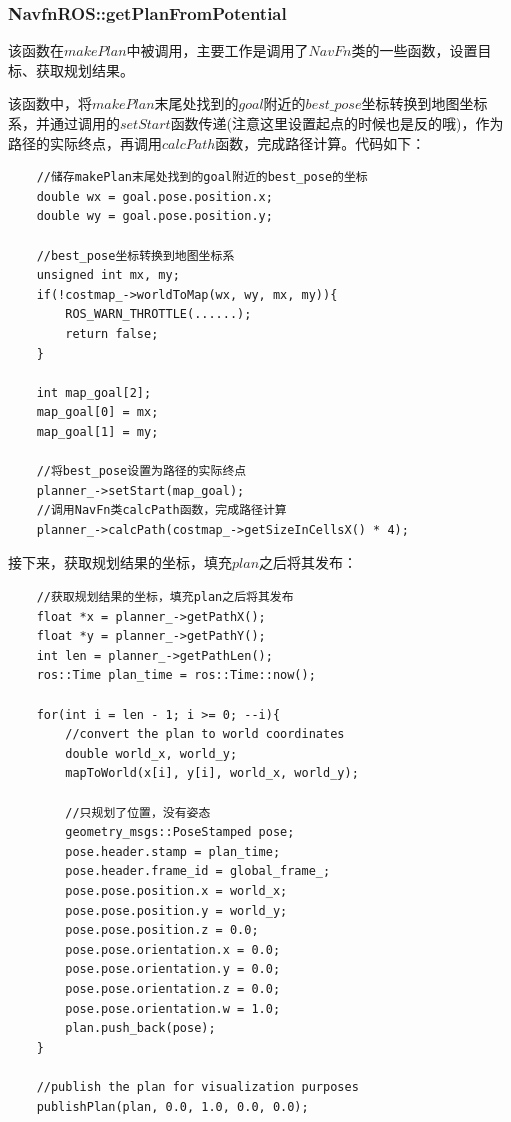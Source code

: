 \documentclass[9pt, oneside]{book}
\begin{document}
\subsubsection{NavfnROS::getPlanFromPotential}

该函数在$makePlan$中被调用，主要工作是调用了$NavFn$类的一些函数，设置目标、获取规划结果。

该函数中，将$makePlan$末尾处找到的$goal$附近的$best\_pose$坐标转换到地图坐标系，并通过调用的$setStart$函数传递(注意这里设置起点的时候也是反的哦)，作为路径的实际终点，再调用$calcPath$函数，完成路径计算。代码如下：

\begin{verbatim}
    //储存makePlan末尾处找到的goal附近的best_pose的坐标
    double wx = goal.pose.position.x;
    double wy = goal.pose.position.y;

    //best_pose坐标转换到地图坐标系
    unsigned int mx, my;
    if(!costmap_->worldToMap(wx, wy, mx, my)){
        ROS_WARN_THROTTLE(......);
        return false;
    }

    int map_goal[2];
    map_goal[0] = mx;
    map_goal[1] = my;

    //将best_pose设置为路径的实际终点
    planner_->setStart(map_goal);
    //调用NavFn类calcPath函数，完成路径计算
    planner_->calcPath(costmap_->getSizeInCellsX() * 4);
\end{verbatim}

接下来，获取规划结果的坐标，填充$plan$之后将其发布：

\begin{verbatim}
    //获取规划结果的坐标，填充plan之后将其发布
    float *x = planner_->getPathX();
    float *y = planner_->getPathY();
    int len = planner_->getPathLen();
    ros::Time plan_time = ros::Time::now();

    for(int i = len - 1; i >= 0; --i){
        //convert the plan to world coordinates
        double world_x, world_y;
        mapToWorld(x[i], y[i], world_x, world_y);

        //只规划了位置，没有姿态
        geometry_msgs::PoseStamped pose;
        pose.header.stamp = plan_time;
        pose.header.frame_id = global_frame_;
        pose.pose.position.x = world_x;
        pose.pose.position.y = world_y;
        pose.pose.position.z = 0.0;
        pose.pose.orientation.x = 0.0;
        pose.pose.orientation.y = 0.0;
        pose.pose.orientation.z = 0.0;
        pose.pose.orientation.w = 1.0;
        plan.push_back(pose);
    }

    //publish the plan for visualization purposes
    publishPlan(plan, 0.0, 1.0, 0.0, 0.0);
\end{verbatim}
\end{document}
